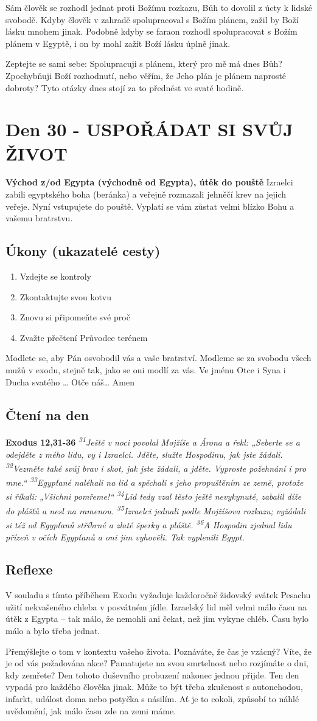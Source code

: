 \documentclass[11pt]{article}
\newcommand{\zacatekPatyTyden}{
  \textbf{Východ z/od Egypta (východně od Egypta), útěk do pouště} \newline
  Izraelci zabili egyptského boha (beránka) a veřejně rozmazali jehněčí krev na jejich veřeje. Nyní vstupujete
  do pouště. Vyplatí se vám zůstat velmi blízko Bohu a vašemu bratrstvu.

\subsection*{Úkony (ukazatelé cesty)}
\begin{enumerate}
  \item Vzdejte se kontroly
  \item Zkontaktujte svou kotvu
  \item Znovu si připomeňte své proč
  \item Zvažte přečtení Průvodce terénem
\end{enumerate}
Modlete se, aby Pán osvobodil vás a vaše bratrství. \newline
Modleme se za svobodu všech mužů v exodu, stejně tak, jako se oni modlí za vás.\newline
Ve jménu Otce i Syna i Ducha svatého …  Otče náš… Amen
}
\begin{document}
Sám člověk se rozhodl jednat proti Božímu rozkazu, Bůh to dovolil z úcty k lidské svobodě. Kdyby člověk v
zahradě spolupracoval s Božím plánem, zažil by Boží lásku mnohem jinak. Podobně kdyby se faraon rozhodl
spolupracovat s Božím plánem v Egyptě, i on by mohl zažít Boží lásku úplně jinak.

Zeptejte se sami sebe: Spolupracuji s plánem, který pro mě má dnes Bůh? Zpochybňuji Boží rozhodnutí,
nebo věřím, že Jeho plán je plánem naprosté dobroty? Tyto otázky dnes stojí za to přednést ve svaté hodině.


\newpage
\section{Den 30 - USPOŘÁDAT SI SVŮJ ŽIVOT}
\zacatekPatyTyden
\subsection*{Čtení na den}
\textbf{Exodus 12,31-36}
\newline
\textit{
\textsuperscript{31}Ještě v noci povolal Mojžíše a Árona a řekl: „Seberte se a odejděte z mého lidu, vy i Izraelci. Jděte, služte Hospodinu, jak jste žádali.
\textsuperscript{32}Vezměte také svůj brav i skot, jak jste žádali, a jděte. Vyproste požehnání i pro mne.“
\textsuperscript{33}Egypťané naléhali na lid a spěchali s jeho propuštěním ze země, protože si říkali: „Všichni pomřeme!“
\textsuperscript{34}Lid tedy vzal těsto ještě nevykynuté, zabalil díže do plášťů a nesl na ramenou.
\textsuperscript{35}Izraelci jednali podle Mojžíšova rozkazu; vyžádali si též od Egypťanů stříbrné a zlaté šperky a pláště.
\textsuperscript{36}A Hospodin zjednal lidu přízeň v očích Egypťanů a oni jim vyhověli. Tak vyplenili Egypt.
}

\subsection*{Reflexe}

V souladu s tímto příběhem Exodu vyžaduje každoročně židovský svátek Pesachu užití nekvašeného chleba
v posvátném jídle. Izraelský lid měl velmi málo času na útěk z Egypta – tak málo, že nemohli ani čekat, než jim
vykyne chléb. Času bylo málo a bylo třeba jednat.

Přemýšlejte o tom v kontextu vašeho života. Poznáváte, že čas je vzácný? Víte, že je od vás požadována akce?
Pamatujete na svou smrtelnost nebo rozjímáte o dni, kdy zemřete? Den tohoto duševního probuzení nakonec jednou
přijde. Ten den vypadá pro každého člověka jinak. Může to být třeba zkušenost s autonehodou, infarkt, událost doma
nebo potyčka s násilím. Ať je to cokoli, způsobí to náhlé uvědomění, jak málo času zde na zemi máme.
\end{document}
